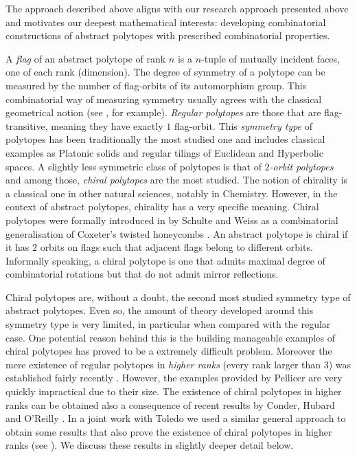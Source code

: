 \documentclass[a4paper,12pt,english]{article}
\begin{document}
The approach described above aligns with our research approach presented above and motivates our deepest mathematical interests: developing combinatorial constructions of abstract polytopes with prescribed combinatorial properties.





A \emph{flag} of an abstract polytope of rank $n$ is a $n$-tuple of mutually incident faces, one of each rank (dimension). 
The degree of symmetry of a polytope can be measured by the number of flag-orbits of its automorphism group.
This combinatorial way of measuring symmetry usually agrees with the classical geometrical notion (see \cite{DuVal1964_HomographiesQuaternionsRotations,Coxeter1973_RegularPolytopes,Coxeter1991_RegularComplexPolytopes}, for example).
\emph{Regular polytopes} are those that are flag-transitive, meaning they have exactly $1$ flag-orbit.
This \emph{symmetry type} of polytopes has been traditionally the most studied one and includes classical examples as Platonic solids and regular tilings of Euclidean and Hyperbolic spaces.
A slightly less symmetric class of polytopes is that of \emph{$2$-orbit polytopes} and among those, \emph{chiral polytopes} are the most studied.
The notion of chirality is a classical one in other natural sciences, notably in Chemistry.
However, in the context of abstract polytopes, chirality has a very specific meaning. 
Chiral polytopes were formally introduced in \cite*{SchulWeiss1991_ChiralPolytopes} by Schulte and Weiss as a combinatorial generalisation of Coxeter's twisted honeycombs \cite*{Coxeter1970_TwistedHoneycombs}.
An abstract polytope is chiral if it has $2$ orbits on flags such that adjacent flags belong to different orbits. 
Informally speaking, a chiral polytope is one that admits maximal degree of combinatorial rotations but that do not admit mirror reflections.

Chiral polytopes are, without a doubt, the second most studied symmetry type of abstract polytopes. 
Even so, the amount of theory developed around this symmetry type is very limited, in particular when compared with the regular case. 
One potential reason behind this is the building manageable examples of chiral polytopes has proved to be a extremely difficult problem. 
Moreover the mere existence of regular polytopes in \emph{higher ranks} (every rank larger than $3$) was established fairly recently \cite{Pellicer2010_ConstructionHigherRank}. 
However, the examples provided by Pellicer are very quickly impractical due to their size.
The existence of chiral polytopes in higher ranks can be obtained also a consequence of recent results by Conder, Hubard and O'Reilly \cite*{CondHubORe2024_ConstructionChiralPolytopes}.
In a joint work with Toledo we used a similar general approach to obtain some results that also prove the existence of chiral polytopes in higher ranks (see \cite{MonteToled_ChiralExtensionsRegular_preprint}). 
We discuss these results in slightly deeper detail below.
\end{document}
